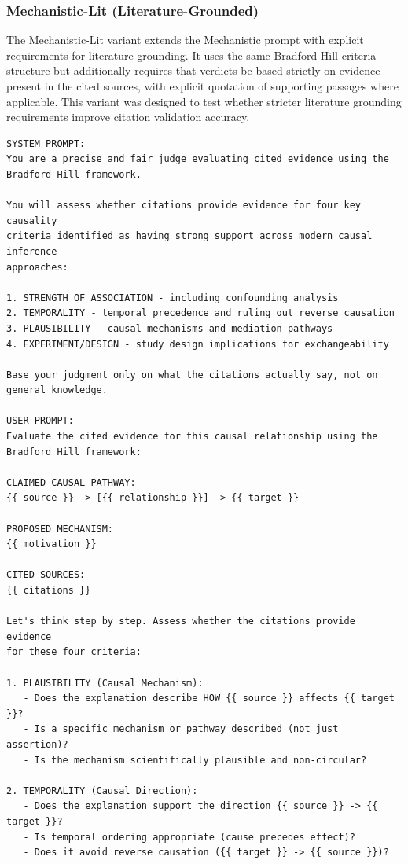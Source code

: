 \subsubsection{Mechanistic-Lit (Literature-Grounded)}

The Mechanistic-Lit variant extends the Mechanistic prompt with explicit requirements for literature grounding. It uses the same Bradford Hill criteria structure but additionally requires that verdicts be based strictly on evidence present in the cited sources, with explicit quotation of supporting passages where applicable. This variant was designed to test whether stricter literature grounding requirements improve citation validation accuracy.

\begin{lstlisting}[caption={Citation Judge: Mechanistic-Lit Prompt},label={lst:citation_mechanistic_lit}]
SYSTEM PROMPT:
You are a precise and fair judge evaluating cited evidence using the 
Bradford Hill framework.

You will assess whether citations provide evidence for four key causality 
criteria identified as having strong support across modern causal inference 
approaches:

1. STRENGTH OF ASSOCIATION - including confounding analysis
2. TEMPORALITY - temporal precedence and ruling out reverse causation
3. PLAUSIBILITY - causal mechanisms and mediation pathways
4. EXPERIMENT/DESIGN - study design implications for exchangeability

Base your judgment only on what the citations actually say, not on 
general knowledge.

USER PROMPT:
Evaluate the cited evidence for this causal relationship using the 
Bradford Hill framework:

CLAIMED CAUSAL PATHWAY:
{{ source }} -> [{{ relationship }}] -> {{ target }}

PROPOSED MECHANISM:
{{ motivation }}

CITED SOURCES:
{{ citations }}

Let's think step by step. Assess whether the citations provide evidence 
for these four criteria:

1. PLAUSIBILITY (Causal Mechanism):
   - Does the explanation describe HOW {{ source }} affects {{ target }}?
   - Is a specific mechanism or pathway described (not just assertion)?
   - Is the mechanism scientifically plausible and non-circular?

2. TEMPORALITY (Causal Direction):
   - Does the explanation support the direction {{ source }} -> {{ target }}?
   - Is temporal ordering appropriate (cause precedes effect)?
   - Does it avoid reverse causation ({{ target }} -> {{ source }})?


\end{lstlisting}
